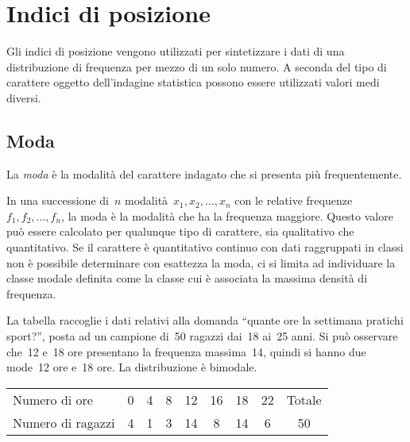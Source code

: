 

\section{Indici di posizione}
\label{sec:c_stat_posizione}

Gli indici di posizione vengono utilizzati per sintetizzare i dati di una 
distribuzione di frequenza per mezzo di un solo numero.
A seconda del tipo di carattere oggetto dell'indagine statistica possono 
essere utilizzati valori medi diversi.

\subsection{Moda}

\begin{definizione}
La \emph{moda} è la modalità del carattere indagato che si presenta più 
frequentemente.
\end{definizione}

In una successione di~$n$ modalità~$x_1, x_2, \ldots, x_n$
con le relative frequenze~$f_1, f_2, \ldots, f_n$, la moda è la modalità 
che ha la frequenza maggiore.
Questo valore può essere calcolato per qualunque tipo di carattere, sia 
qualitativo che quantitativo.
Se il carattere è quantitativo continuo con dati raggruppati in classi non 
è possibile determinare con esattezza la moda, ci si limita
ad individuare la classe modale definita come la classe cui è associata la 
massima densità di frequenza.


\begin{esempio}
La tabella raccoglie i dati relativi alla domanda ``quante ore la settimana 
pratichi sport?'', posta ad un
campione di~50 ragazzi dai~18 ai~25 anni. Si può osservare che~12 e~18 ore 
presentano la frequenza massima~14, quindi si hanno due
mode~12 ore e~18 ore. La distribuzione è bimodale.


\begin{center}
\begin{tabular}{lcccccccc}
\toprule
Numero di ore & 0 &4 &8 &12 &16 &18 &22 &Totale\\
 Numero di ragazzi& 4 & 1 & 3 & 14 & 8 & 14 & 6 & 50 \\
\bottomrule
\end{tabular}
\end{center}
 \end{esempio}

